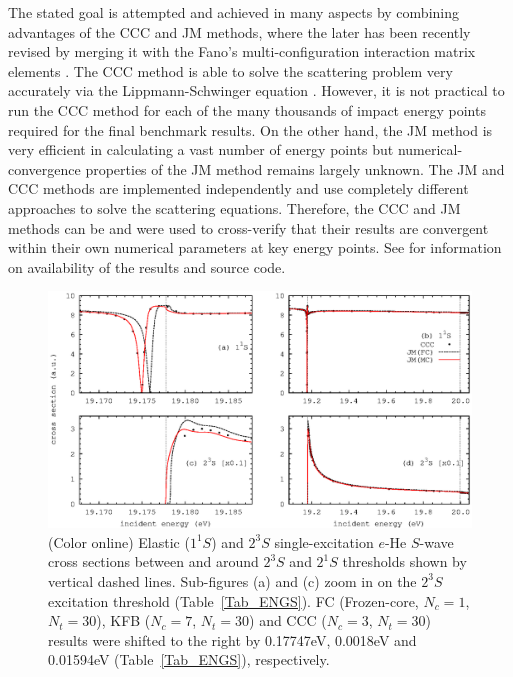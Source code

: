 \documentclass[aip
, pra
, showpacs
, aps
, twocolumn
, groupedaddress
, floatfix
]{revtex4}
\begin{document}
The stated goal is attempted and achieved in many aspects by combining advantages of the CCC and JM methods,
where the later has been recently revised \cite{KFB11} by merging it with the Fano's multi-configuration interaction matrix elements \cite{Fano65}.
The CCC method is able to solve the scattering problem very accurately via the Lippmann-Schwinger equation \cite{BS92p6995}.
However, it is not practical to run the CCC method for each of the many thousands of impact energy points required for the final benchmark results.
On the other hand, the JM method is very efficient \cite{HY74p1201,BR76p1491} in calculating a vast number of energy points
but numerical-convergence properties of the JM method remains largely unknown.
The JM and CCC methods are implemented independently and use completely different approaches to solve the scattering equations.
Therefore, the CCC and JM methods can be and were used to cross-verify that their results are convergent within their own numerical parameters at key energy points.
See \cite{JMatrixWebsite} for information on availability of the results and source code.


\begin{figure}[htb]
\includegraphics[scale=1]{fig1.ps}
\caption{(Color online) Elastic ($1^1S$) and
$2^3S$ single-excitation $e$-He $S$-wave cross sections between and around $2^3S$ and $2^1S$ thresholds shown by vertical dashed lines.
Sub-figures (a) and (c) zoom in on the $2^3S$ excitation threshold (Table~\ref{Tab_ENGS}).
FC (Frozen-core, $N_c=1$, $N_t=30$), KFB ($N_c=7$, $N_t=30$) and CCC ($N_c=3$, $N_t=30$) results  were shifted to the right by 0.17747eV, 0.0018eV
and 0.01594eV (Table~\ref{Tab_ENGS}), respectively.
}
\label{Fig_1}
\end{figure}
\end{document}
